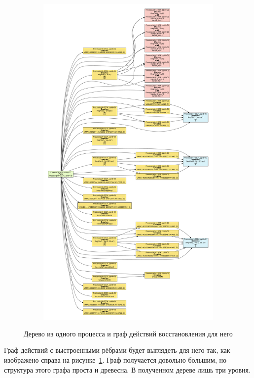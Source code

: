 \begin{figure}[ht!]
\begin{subfigure}[b]{0.5\textwidth}
		\includegraphics[width=\textwidth]{fig/exSimpleGraph.pdf}
	\end{subfigure}
	\caption{Дерево из одного процесса и граф действий восстановления для него}
	\label{chap2:fig:oneprocess}
\end{figure}

Граф действий с выстроенными рёбрами будет выглядеть для него так, как изображено справа на рисунке~\ref{chap2:fig:oneprocess}. Граф получается довольно большим, но структура этого графа проста и древесна. В полученном дереве лишь три уровня.

